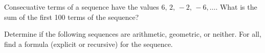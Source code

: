 \documentclass[addpoints]{exam}
\begin{document}
\begin{questions}

    \question Consecuative terms of a sequence have the values $6,\,2,\,-2,\,-6,\ldots$. What is the sum of the first 100 terms of the sequence?


    \newpage

    \question Determine if the following sequences are arithmetic, geometric, or neither. For all, find a formula (explicit or recursive) for the sequence.
\end{questions}
\end{document}
